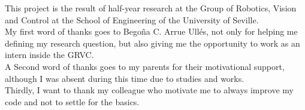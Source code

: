 This project is the result of half-year research at the Group of Robotics, Vision and Control at the School of Engineering of the University of Seville. \\


My first word of thanks goes to Bego\~na C. Arrue Ull\'es, not only for helping me defining my research question, but also giving me the opportunity to work as an intern inside the GRVC. \\

A Second word of thanks goes to my parents for their motivational support, although I was absent during this time due to studies and works.  \\

Thirdly, I want to thank my colleague who motivate me to always improve my code and not to settle for the basics.  \\

